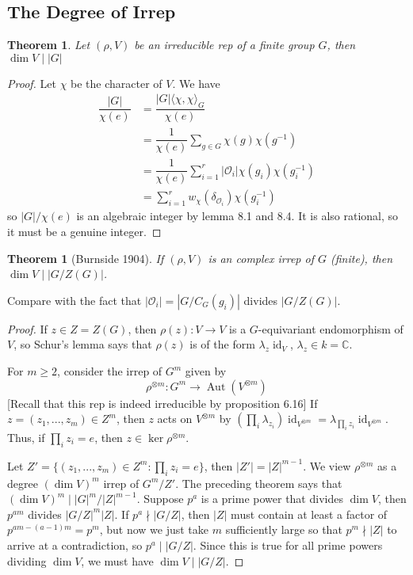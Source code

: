 \documentclass{article}
\theoremstyle{definition}
\theoremstyle{remark}
\theoremstyle{plain}
\newtheorem{thm}[defn]{Theorem}
\newcommand{\CC}{\mathbb{C}}
\newcommand{\id}{\operatorname{id}}
\begin{document}
\subsection{The Degree of Irrep}
\begin{thm}
    Let $(\rho, V)$ be an irreducible rep of a finite group $G$, then $\dim V\mid |G|$
\end{thm}
\begin{proof}
    Let $\chi$ be the character of $V$. We have
    \begin{align*}
        \dfrac{|G|}{\chi(e)}&=\dfrac{|G|\langle\chi,\chi\rangle_G}{\chi(e)}\\
        &=\dfrac{1}{\chi(e)}\sum_{g\in G}\chi(g)\chi(g^{-1})\\
        &=\dfrac{1}{\chi(e)}\sum_{i=1}^r|\mathcal O_i|\chi(g_i)\chi(g_i^{-1})\\
        &=\sum_{i=1}^rw_\chi(\delta_{\mathcal O_i})\chi(g_i^{-1})
    \end{align*}
    so $|G|/\chi(e)$ is an algebraic integer by lemma 8.1 and 8.4. It is also rational, so it must be a genuine integer.
\end{proof}

\begin{thm}[Burnside 1904]
    If $(\rho, V)$ is an complex irrep of $G$ (finite), then $\dim V\mid |G/Z(G)|$.
\end{thm}
Compare with the fact that $|\mathcal O_i|=|G/C_G(g_i)|$ divides $|G/Z(G)|$.
\begin{proof}
    If $z\in Z=Z(G)$, then $\rho(z):V\to V$ is a $G$-equivariant endomorphism of $V$, so Schur's lemma says that $\rho(z)$ is of the form $\lambda_z\id_V$, $\lambda_z\in k=\CC$.

    For $m\ge 2$, consider the irrep of $G^m$ given by
    \[\rho^{\otimes m}:G^m\to\operatorname{Aut}(V^{\otimes m})\]
    [Recall that this rep is indeed irreducible by proposition 6.16]
    If $z=(z_1,...,z_m)\in Z^m$, then $z$ acts on $V^{\otimes m}$ by $\left(\prod_i\lambda_{z_i}\right)\id_{V^{\otimes m}}=\lambda_{\prod_iz_i}\id_{V^{\otimes m}}$. Thus, if $\prod_iz_i=e$, then $z\in\ker\rho^{\otimes m}$.

    Let $Z'=\{(z_1,...,z_m)\in Z^m:\prod_iz_i=e\}$, then $|Z'|=|Z|^{m-1}$. We view $\rho^{\otimes m}$ as a degree $(\dim V)^m$ irrep of $G^m/Z'$. The preceding theorem says that $(\dim V)^m\mid |G|^m/|Z|^{m-1}$. Suppose $p^a$ is a prime power that divides $\dim V$, then $p^{am}$ divides $|G/Z|^m|Z|$. If $p^a\nmid |G/Z|$, then $|Z|$ must contain at least a factor of $p^{am-(a-1)m}=p^m$, but now we just take $m$ sufficiently large so that $p^m\nmid |Z|$ to arrive at a contradiction, so $p^a\mid |G/Z|$. Since this is true for all prime powers dividing $\dim V$, we must have $\dim V\mid |G/Z|$.
    
\end{proof}
\end{document}
